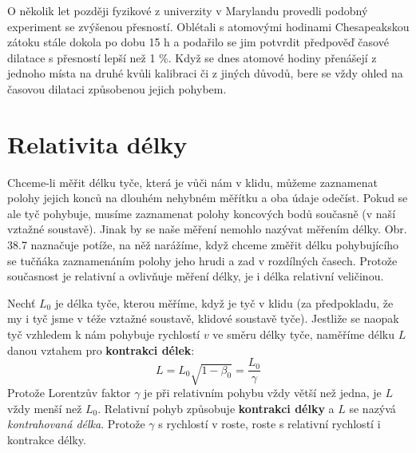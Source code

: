       O několik let později fyzikové z univerzity v Marylandu provedli podobný experiment se
      zvýšenou přesností. Oblétali s atomovými hodinami Chesapeakskou zátoku stále dokola po dobu 15
      h a podařilo se jim potvrdit předpověď časové dilatace s přesností lepší než 1 \%. Když se
      dnes atomové hodiny přenášejí z jednoho místa na druhé kvůli kalibraci či z jiných důvodů,
      bere se vždy ohled na časovou dilataci způsobenou jejich pohybem.

      

      

      
  
  \section{Relativita délky}\label{fyz:IchapXVsecII}     
    Chceme-li měřit délku tyče, která je vůči nám v klidu, můžeme zaznamenat polohy jejich konců na
    dlouhém nehybném měřítku a oba údaje odečíst. Pokud se ale tyč pohybuje, musíme zaznamenat
    polohy koncových bodů současně (v naší vztažné soustavě). Jinak by se naše měření nemohlo
    nazývat měřením délky. Obr. 38.7 naznačuje potíže, na něž narážíme, když chceme změřit délku
    pohybujícího se tučňáka zaznamenáním polohy jeho hrudi a zad v rozdílných časech. Protože
    současnost je relativní a ovlivňuje měření délky, je i délka relativní veličinou.  

    Nechť \(L_0\) je délka tyče, kterou měříme, když je tyč v klidu (za předpokladu, že my i tyč
    jsme v téže vztažné soustavě, klidové soustavě tyče). Jestliže se naopak tyč vzhledem k nám
    pohybuje rychlostí \(v\) ve směru délky tyče, naměříme délku \(L\) danou vztahem pro
    \textbf{kontrakci délek}:
    \begin{equation}\label{fyz:eq997}
      L = L_0\sqrt{1-\beta_0} = \dfrac{L_0}{\gamma}
    \end{equation}
    Protože Lorentzův faktor \(\gamma\) je při relativním pohybu vždy větší než jedna, je \(L\) vždy
    menší než \(L_ 0\). Relativní pohyb způsobuje \textbf{kontrakci délky} a \(L\) se nazývá
    \emph{kontrahovaná délka}. Protože \(\gamma\) s rychlostí v roste, roste s relativní rychlostí i
    kontrakce délky.

